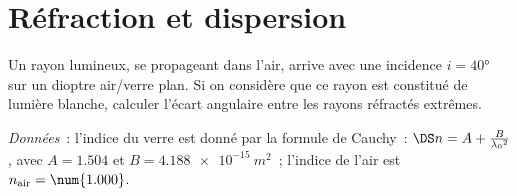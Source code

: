 \documentclass[../../main/main.tex]{subfiles}
\begin{document}
\section{Réfraction et dispersion}
Un rayon lumineux, se propageant dans l'air, arrive avec une incidence $i =
	\ang{40;;}$
sur un dioptre air/verre plan. Si on considère que ce rayon est constitué de
lumière blanche, calculer l'écart angulaire entre les rayons réfractés extrêmes.

\textit{Données}~: l'indice du verre est donné par la formule de Cauchy~: $\DS n
	= A + \frac{B}{\lambda_0{}^2}$, avec $A = \num{1.504}$ et $B =
	\SI{4.188e-15}{m^2}$~; l'indice de l'air est $n_{\rm air} = \num{1.000}$.
\end{document}
